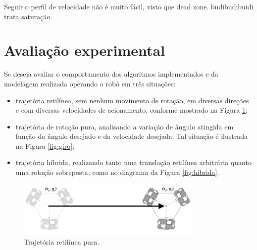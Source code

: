 

Seguir o perfil de velocidade não é muito fácil, visto que dead zone. budibudibuidi \citet{indiveri2009swedish} trata saturação.

\section{Avaliação experimental}
\label{sec:experimental}

Se deseja avaliar o comportamento dos algoritmos implementados e da modelagem realizada operando o robô em três situações:
\begin{itemize}
  \item{trajetória retilínea, sem nenhum movimento de rotação, em diversas direções e com diversas velocidades de acionamento, conforme mostrado na Figura \ref{fig:reta};}
  \item{trajetória de rotação pura, analisando a variação de ângulo atingida em função do ângulo desejado e da velocidade desejada. Tal situação é ilustrada na Figura \ref{fig:giro};}
  \item{trajetória híbrida, realizando tanto uma translação retilínea arbitrária quanto uma rotação sobreposta, como no diagrama da Figura \ref{fig:hibrida}.}
\end{itemize}

\begin{figure}[h]
  \centering
  \includegraphics[width = 0.8\textwidth]{imagens/reta}
  \caption{Trajetória retilínea pura.}
  \label{fig:reta}
\end{figure}

